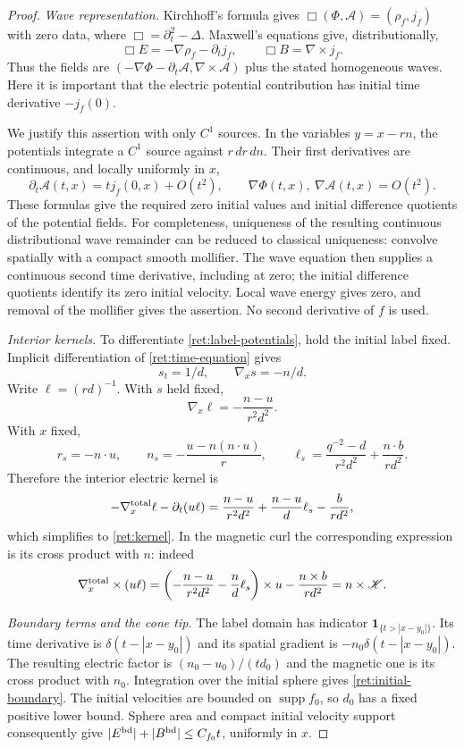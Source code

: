 \begin{proof}
\emph{Wave representation.}
Kirchhoff's formula gives
$\Box(\Phi,\mathcal A)=(\rho_f,j_f)$ with zero data, where
$\Box=\partial_t^2-\Delta$. Maxwell's equations give, distributionally,
\[
 \Box E=-\nabla\rho_f-\partial_tj_f,\qquad
 \Box B=\nabla\times j_f.
\]
Thus the fields are
$(-\nabla\Phi-\partial_t\mathcal A,\nabla\times\mathcal A)$ plus
the stated homogeneous waves. Here it is important that the electric
potential contribution has initial time derivative $-j_f(0)$.

We justify this assertion with only $C^1$ sources. In the variables
$y=x-rn$, the potentials integrate a $C^1$ source against $r\,dr\,dn$.
Their first derivatives are continuous, and locally uniformly in $x$,
\[
 \partial_t\mathcal A(t,x)=t j_f(0,x)+O(t^2),\qquad
 \nabla\Phi(t,x),\ \nabla\mathcal A(t,x)=O(t^2).
\]
These formulas give the required zero initial values and initial
difference quotients of the potential fields. For completeness,
uniqueness of the resulting continuous distributional wave remainder
can be reduced to classical uniqueness: convolve spatially with a
compact smooth mollifier. The wave equation then supplies a continuous
second time derivative, including at zero; the initial difference
quotients identify its zero initial velocity. Local wave energy gives
zero, and removal of the mollifier gives the assertion. No second
derivative of $f$ is used.

\emph{Interior kernels.}
To differentiate \eqref{ret:label-potentials}, hold the initial label
fixed. Implicit differentiation of \eqref{ret:time-equation} gives
\[
 s_t=1/d,\qquad\nabla_xs=-n/d.
\]
Write $\ell=(rd)^{-1}$. With $s$ held fixed,
\[
 \nabla_x\ell=-\frac{n-u}{r^2d^2}.
\]
With $x$ fixed,
\[
 r_s=-n\cdot u,\qquad
 n_s=-\frac{u-n(n\cdot u)}r,\qquad
 \ell_s=\frac{q^{-2}-d}{r^2d^2}+\frac{n\cdot b}{rd^2}.
\]
Therefore the interior electric kernel is
\[
 -\nabla_x^{\rm total}\ell-\partial_t(u\ell)
 =\frac{n-u}{r^2d^2}+\frac{n-u}{d}\ell_s-\frac b{rd^2},
\]
which simplifies to \eqref{ret:kernel}. In the magnetic curl the
corresponding expression is its cross product with $n$: indeed
\[
 \nabla_x^{\rm total}\times(u\ell)
 =\left(-\frac{n-u}{r^2d^2}-\frac n d \ell_s\right)\times u
                  -\frac{n\times b}{rd^2}
 =n\times\mathscr K.
\]

\emph{Boundary terms and the cone tip.}
The label domain has indicator $\mathbf1_{\{t>|x-y_0|\}}$.
Its time derivative is $\delta(t-|x-y_0|)$ and its spatial gradient is
$-n_0\delta(t-|x-y_0|)$. The resulting electric factor is
$(n_0-u_0)/(td_0)$ and the magnetic one is its cross product with $n_0$.
Integration over the initial sphere gives \eqref{ret:initial-boundary}.
The initial velocities are bounded on $\operatorname{supp}f_0$, so
$d_0$ has a fixed positive lower bound. Sphere area and compact initial
velocity support consequently give
$|E^{\rm bd}|+|B^{\rm bd}|\leq C_{f_0}t$, uniformly in $x$.


\end{proof}
